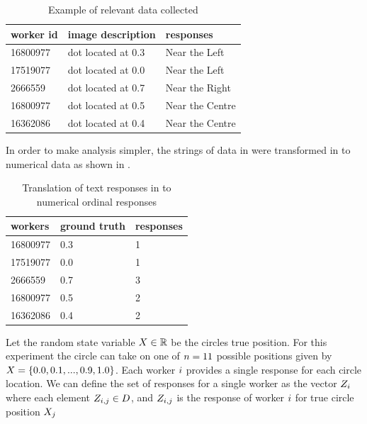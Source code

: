 \begin{table}
\centering
    \begin{tabular}{|l|l|l|}
    \hline
    \textbf{worker id} &    \textbf{image description} & \textbf{responses}       \\ \hline
    16800977      & dot located at 0.3   & Near the Left   \\
    17519077      & dot located at 0.0   & Near the Left   \\
    2666559       & dot located at 0.7   & Near the Right  \\
    16800977      & dot located at 0.5   & Near the Centre \\
    16362086      & dot located at 0.4   & Near the Centre \\ \hline
    \end{tabular}
    \caption{Example of relevant data collected}
  \label{Table:text responses}
\end{table}


In order to make analysis simpler, the strings of data in  were transformed in to numerical data as shown in .


\begin{table}
\centering
    \begin{tabular}{|l|l|l|}
    \hline
    \textbf{workers}  & \textbf{ground truth} & \textbf{responses} \\ \hline
    16800977 & 0.3          & 1         \\
    17519077 & 0.0          & 1         \\
    2666559  & 0.7          & 3         \\
    16800977 & 0.5          & 2         \\
    16362086 & 0.4          & 2         \\ \hline
    \end{tabular}
    \caption{Translation of text responses in to numerical ordinal responses }
  \label{Table:ordinal responses}
\end{table}





Let the random state variable $X \in \mathbb{R}$ be the circles true position. 
For this experiment the circle can take on one of $n=11$ possible positions given by $X = \lbrace 0.0,0.1,...,0.9,1.0 \rbrace$.
 Each worker $i$ provides a single response for each circle location. We can define the set of responses for a single worker as the vector $Z_i$ where each element $Z_{i,j} \in D$, and $Z_{i,j}$ is the response of worker $i$ for true circle position $X_j$



